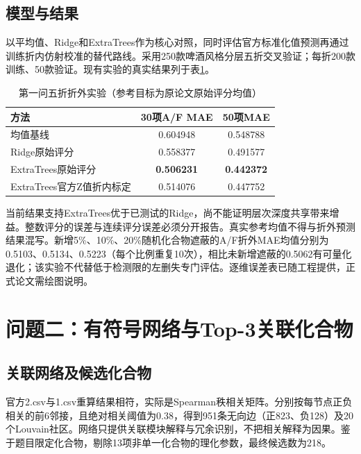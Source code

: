 \subsection{模型与结果}
以平均值、Ridge和ExtraTrees作为核心对照，同时评估官方标准化值预测再通过训练折内仿射校准的替代路线。采用250款啤酒风格分层五折交叉验证；每折200款训练、50款验证。现有实验的真实结果列于表\ref{tab:q1}。
\begin{table}[htbp]
\centering
\caption{第一问五折折外实验（参考目标为原论文原始评分均值）}\label{tab:q1}
\begin{tabular}{lcc}
\toprule
方法 & 30项A/F MAE & 50项MAE \\
\midrule
均值基线 & 0.604948 & 0.548788 \\
Ridge原始评分 & 0.558377 & 0.491577 \\
ExtraTrees原始评分 & \textbf{0.506231} & \textbf{0.442372} \\
ExtraTrees官方Z值折内标定 & 0.514076 & 0.447752 \\
\bottomrule
\end{tabular}
\end{table}
当前结果支持ExtraTrees优于已测试的Ridge，尚不能证明层次深度共享带来增益。整数评分的误差与连续评分误差必须分开报告。真实参考均值不得与折外预测结果混写。新增5\%、10\%、20\%随机化合物遮蔽的A/F折外MAE均值分别为0.5103、0.5134、0.5223（每个比例重复10次），相比未新增遮蔽的0.5062有可量化退化；该实验不代替低于检测限的左删失专门评估。逐维误差表已随工程提供，正式论文需绘图说明。

\section{问题二：有符号网络与Top-3关联化合物}
\subsection{关联网络及候选化合物}
官方2.csv与1.csv重算结果相符，实际是Spearman秩相关矩阵。分别按每节点正负相关的前6邻接，且绝对相关阈值为0.38，得到951条无向边（正823、负128）及20个Louvain社区。网络只提供关联模块解释与冗余识别，不把相关解释为因果。鉴于题目限定化合物，剔除13项非单一化合物的理化参数，最终候选数为218。

